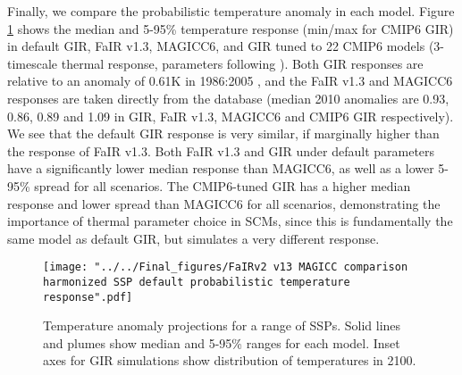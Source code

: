 \documentclass[gmd, manuscript]{copernicus}
\begin{document}
Finally, we compare the probabilistic temperature anomaly in each model. Figure \ref{fig:SSPtemps} shows the median and 5-95\% temperature response (min/max for CMIP6 GIR) in default GIR, FaIR v1.3, MAGICC6, and GIR tuned to 22 CMIP6 models (3-timescale thermal response, parameters following \cite{Tsutsui2019}). Both GIR responses are relative to an anomaly of 0.61K in 1986:2005 \citep{Kirtman2013}, and the FaIR v1.3 and MAGICC6 responses are taken directly from the database (median 2010 anomalies are 0.93, 0.86, 0.89 and 1.09 in GIR, FaIR v1.3, MAGICC6 and CMIP6 GIR respectively). We see that the default GIR response is very similar, if marginally higher than the response of FaIR v1.3. Both FaIR v1.3 and GIR under default parameters have a significantly lower median response than MAGICC6, as well as a lower 5-95\% spread for all scenarios. The CMIP6-tuned GIR has a higher median response and lower spread than MAGICC6 for all scenarios, demonstrating the importance of thermal parameter choice in SCMs, since this is fundamentally the same model as default GIR, but simulates a very different response.
\begin{figure}[t]
    \texttt{[image: "../../Final\_figures/FaIRv2 v13 MAGICC comparison harmonized SSP default probabilistic temperature response".pdf]}
    \caption{Temperature anomaly projections for a range of SSPs. Solid lines and plumes show median and 5-95\% ranges for each model. Inset axes for GIR simulations show distribution of temperatures in 2100.}
    \label{fig:SSPtemps}
\end{figure}
\end{document}
